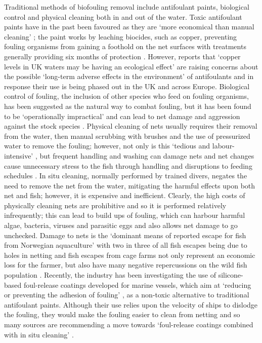 \documentclass[11.5pt, twoside, a4paper]{article}
\begin{document}
Traditional methods of biofouling removal include antifoulant paints, biological control and physical cleaning both in and out of the water. Toxic antifoulant paints have in the past been favoured as they are `more economical than manual cleaning' \cite{braithwaite2004marine}; the paint works by leaching biocides, such as copper, preventing fouling organisms from gaining a foothold on the net surfaces with treatments generally providing six months of protection \cite{beveridge2008cage}. However, reports that `copper levels in UK waters may be having an ecological effect' are raising concerns about the possible `long-term adverse effects in the environment' of antifoulants and in response their use is being phased out in the UK and across Europe. \cite{fitridge2012impact,braithwaite2004marine} Biological control of fouling, the inclusion of other species who feed on fouling organisms, has been suggested as the natural way to combat fouling, but it has been found to be `operationally impractical' \cite{Crown} and can lead to net damage and aggression against the stock species \cite{beveridge2008cage}. Physical cleaning of nets usually requires their removal from the water, then manual scrubbing with brushes and the use of pressurized water to remove the fouling; however, not only is this `tedious and labour-intensive' \cite{braithwaite2004marine}, but frequent handling and washing can damage nets and net changes cause unnecessary stress to the fish through handling and disruptions to feeding schedules \cite{Crown,fitridge2012impact}. In situ cleaning, normally performed by trained divers, negates the need to remove the net from the water, mitigating the harmful effects upon both net and fish; however, it is expensive and inefficient. Clearly, the high costs of physically cleaning nets are prohibitive and so it is performed relatively infrequently; this can lead to build ups of fouling, which can harbour harmful algae, bacteria, viruses and parasitic eggs and also allows net damage to go unchecked. Damage to nets is the `dominant means of reported escape for fish from Norwegian aquaculture' with two in three of all fish escapes being due to holes in netting \cite{jensen2010escapes} and fish escapes from cage farms not only represent an economic loss for the farmer, but also have many negative repercussions on the wild fish population \cite{mcdowell2002stream,jensen2010escapes}. Recently, the industry has been investigating the use of silicone-based foul-release coatings developed for marine vessels, which aim at `reducing or preventing the adhesion of fouling' \cite{fitridge2012impact}, as a non-toxic alternative to traditional antifoulant paints. Although their use relies upon the velocity of ships to dislodge the fouling, they would make the fouling easier to clean from netting and so many sources are recommending a move towards `foul-release coatings combined with in situ cleaning' \cite{Crown}. 
\end{document}
